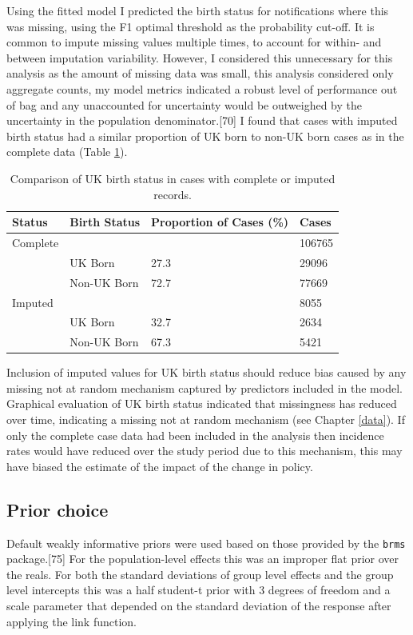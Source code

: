 \documentclass[11pt,twoside]{bristolthesis}
\begin{document}
  Using the fitted model I predicted the birth status for notifications where this was missing, using the F1 optimal threshold as the probability cut-off. It is common to impute missing values multiple times, to account for within- and between imputation variability. However, I considered this unnecessary for this analysis as the amount of missing data was small, this analysis considered only aggregate counts, my model metrics indicated a robust level of performance out of bag and any unaccounted for uncertainty would be outweighed by the uncertainty in the population denominator.{[}70{]} I found that cases with imputed birth status had a similar proportion of UK born to non-UK born cases as in the complete data (Table \ref{tab:07-imp-com}).
  \begin{table}[!h]
  
  \caption{\label{tab:07-imp-com}Comparison of UK birth status in cases with complete or imputed records.}
  \centering
  \begin{tabular}{llll}
  \toprule
  Status & Birth Status & Proportion of Cases (\%) & Cases\\
  \midrule
  Complete &  &  & 106765\\
   & UK Born & 27.3 & 29096\\
   & Non-UK Born & 72.7 & 77669\\
  Imputed &  &  & 8055\\
   & UK Born & 32.7 & 2634\\
  \addlinespace
   & Non-UK Born & 67.3 & 5421\\
  \bottomrule
  \end{tabular}
  \end{table}
  Inclusion of imputed values for UK birth status should reduce bias caused by any missing not at random mechanism captured by predictors included in the model. Graphical evaluation of UK birth status indicated that missingness has reduced over time, indicating a missing not at random mechanism (see Chapter \ref{data}). If only the complete case data had been included in the analysis then incidence rates would have reduced over the study period due to this mechanism, this may have biased the estimate of the impact of the change in policy.
  
  \hypertarget{prior-choice}{%
  \subsection{Prior choice}\label{prior-choice}}
  
  Default weakly informative priors were used based on those provided by the \texttt{brms} package.{[}75{]} For the population-level effects this was an improper flat prior over the reals. For both the standard deviations of group level effects and the group level intercepts this was a half student-t prior with 3 degrees of freedom and a scale parameter that depended on the standard deviation of the response after applying the link function.
  
\end{document}
